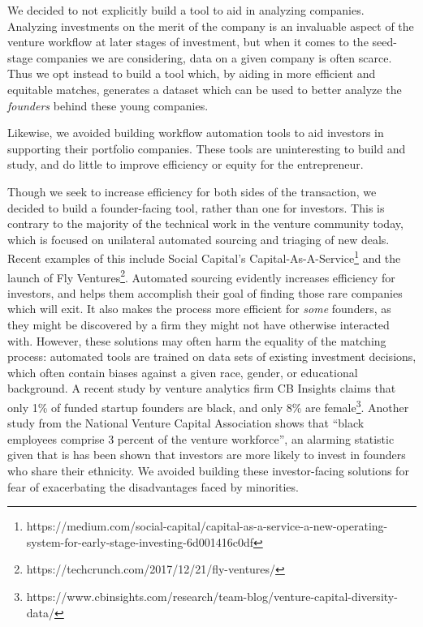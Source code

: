 We decided to not explicitly build a tool to aid in analyzing companies. Analyzing investments on the merit of the company is an invaluable aspect of the venture workflow at later stages of investment, but when it comes to the seed-stage companies we are considering, data on a given company is often scarce. Thus we opt instead to build a tool which, by aiding in more efficient and equitable matches, generates a dataset which can be used to better analyze the \textit{founders} behind these young companies.

Likewise, we avoided building workflow automation tools to aid investors in supporting their portfolio companies. These tools are uninteresting to build and study, and do little to improve efficiency or equity for the entrepreneur.

Though we seek to increase efficiency for both sides of the transaction, we decided to build a founder-facing tool, rather than one for investors. This is contrary to the majority of the technical work in the venture community today, which is focused on unilateral automated sourcing and triaging of new deals. Recent examples of this include Social Capital's Capital-As-A-Service\footnote{https://medium.com/social-capital/capital-as-a-service-a-new-operating-system-for-early-stage-investing-6d001416c0df} and the launch of Fly Ventures\footnote{https://techcrunch.com/2017/12/21/fly-ventures/}. Automated sourcing evidently increases efficiency for investors, and helps them accomplish their goal of finding those rare companies which will exit. It also makes the process more efficient for \textit{some} founders, as they might be discovered by a firm they might not have otherwise interacted with. However, these solutions may often harm the equality of the matching process: automated tools are trained on data sets of existing investment decisions, which often contain biases against a given race, gender, or educational background. A recent study by venture analytics firm CB Insights claims that only 1\% of funded startup founders are black, and only 8\% are female\footnote{https://www.cbinsights.com/research/team-blog/venture-capital-diversity-data/}. Another study from the National Venture Capital Association shows that ``black employees comprise 3 percent of the venture workforce''\cite{nvca-diversity}, an alarming statistic given that is has been shown that investors are more likely to invest in founders who share their ethnicity\cite{BENGTSSON2015338}. We avoided building these investor-facing solutions for fear of exacerbating the disadvantages faced by minorities.

